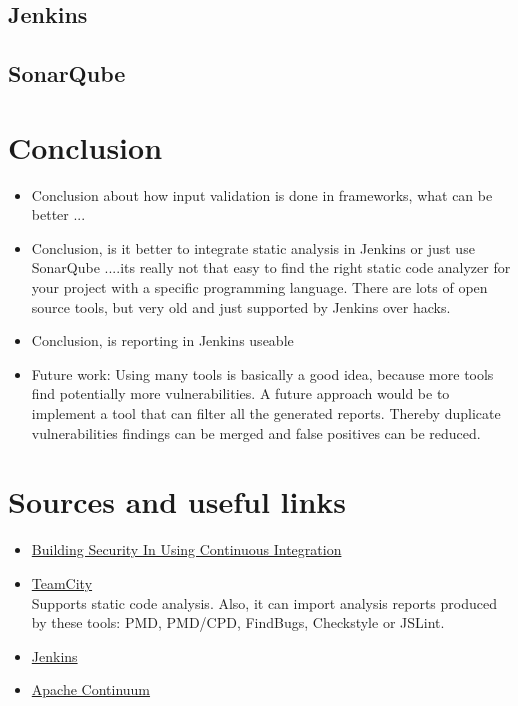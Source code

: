 \documentclass[conference]{IEEEtran}
\begin{document}
\subsection{Jenkins}
\label{sec:evaluation_jenkins}

\subsection{SonarQube}
\label{sec:evaluation_sonarqube}




\section{Conclusion}
\label{sec:conclusion}
\begin{itemize}
	\item Conclusion about how input validation is done in frameworks, what can be better ...
	\item Conclusion, is it better to integrate static analysis in Jenkins or just use SonarQube
	....its really not that easy to find the right static code analyzer for your project with a specific programming language. There are lots of open source tools, but very old and just supported by Jenkins over hacks.
	\item Conclusion, is reporting in Jenkins useable
	\item Future work: Using many tools is basically a good idea, because more tools find potentially more vulnerabilities. A future approach would be to implement a tool that can filter all the generated reports. Thereby duplicate vulnerabilities findings can be merged and false positives can be reduced.
\end{itemize}






\section{Sources and useful links}
\begin{itemize}
	\item \href{http://www.crosstalkonline.org/storage/issue-archives/2010/201003/201003-Stiehm.pdf}{Building Security In Using Continuous Integration}
	\item \href{http://www.jetbrains.com/teamcity}{TeamCity}\\
	Supports static code analysis. Also, it can import analysis reports produced by these tools: PMD, PMD/CPD, FindBugs, Checkstyle or JSLint.
	\item \href{http://jenkins-ci.org}{Jenkins}
	\item \href{http://continuum.apache.org}{Apache Continuum}	
\end{itemize}






\end{document}

